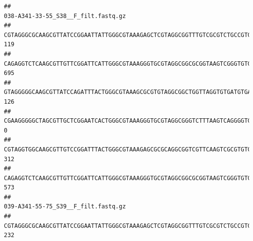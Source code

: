 \documentclass[]{article}
\begin{document}
\begin{verbatim}
##                                                                                                                                                                                                                                                           038-A341-33-55_S38__F_filt.fastq.gz
## CGTAGGGCGCAAGCGTTATCCGGAATTATTGGGCGTAAAGAGCTCGTAGGCGGTTTGTCGCGTCTGCCGTGAAAGTCCGGGGCTCAACTCCGGATCTGCGGTGGGTACGGGCAGACTAGAGTGATGTAGGGGAGACTGGAATTCCTGGTGTAGCGGTGAAATGCGCAGATATCAGGAGGAACACCGATGGCGAAGGCAGGTCTCTGGGCATTAACTGACGCTGAGGAGCGAAAGCATGGGGAGCGAACA                                 119
## CAGAGGTCTCAAGCGTTGTTCGGATTCATTGGGCGTAAAGGGTGCGTAGGCGGCGCGGTAAGTCGGGTGTGAAATCTCGGAGCTTAACTCCGAAACTGCATTCGATACTGCCGTGCTTGAGGACTGGAGAGGAGACTGGAATTTACGGTGTAGCGGTGAAATGCGTAGATATCGTAAGGAAGACCAGTGGCGAAGGCGGGTCTCTGGACAGTTCCTGACGCTGAGGCACGAAGGCCAGGGGAGCAAACG                                 695
## GTAGGGGGCAAGCGTTATCCAGATTTACTGGGCGTAAAGCGCGTGTAGGCGGCTGGTTAGGTGTGATGTGAAATCTTCCGGCTCAACCGGAAAACTGCATTGCAAACCGGCCTGGCTAGAGTGCAGGAGAGGGAAGCGGAATTCCAGGTGTAGCGGTGAAATGCGTAGATATCTGGAGGAACACCAGTGGCGAAGGCGGCTTCCTGGCCTGCAACTGACGCTGAGACGCGAAAGCGTGGGGAGCGAAC                                  126
## CGAAGGGGGCTAGCGTTGCTCGGAATCACTGGGCGTAAAGGGTGCGTAGGCGGGTCTTTAAGTCAGGGGTGAAATCCTGGAGCTCAACTCCAGAACTGCCTTTGATACTGAAGATCTTGAGTTCGGGAGAGGTGAGTGGAACTGCGAGTGTAGAGGTGAAATTCGTAGATATTCGCAAGAACACCAGTGGCGAAGGCGGCTCACTGGCCCGATACTGACGCTGAGGCACGAAAGCGTGGGGAGCAAACA                                   0
## CGTAGGTGGCAAGCGTTGTCCGGATTTACTGGGCGTAAAGAGCGCGCAGGCGGTCGTTCAAGTCGCGTGTGAAAGCCCCCGGCTCAACTGGGGAGGGTCACGCGATACTGATCGACTCGAAGGCAGGAGAGGGTAGTGGAATTCCCGGTGTAGTGGTGAAATGCGTAGATATCGGGAGGAACACCAGTGGCGAAGGCGACTACCTGGCCTGTTCTTGACGCTGAGGCGCGAAAGCTAGGGGAGCAAACG                                 312
## CAGAGGTCTCAAGCGTTGTTCGGATTCATTGGGCGTAAAGGGTGCGTAGGCGGCGCGGTAAGTCGGGTGTGAAATCTCGGGGCTTAACTCCGAAACTGCATTCGATACTGCCGTGCTTGAGGACTGGAGAGGAGACTGGAATTTACGGTGTAGCGGTGAAATGCGTAGATATCGTAAGGAAGACCAGTGGCGAAGGCGGGTCTCTGGACAGTTCCTGACGCTGAGGCACGAAGGCCAGGGGAGCAAACG                                 573
##                                                                                                                                                                                                                                                           039-A341-55-75_S39__F_filt.fastq.gz
## CGTAGGGCGCAAGCGTTATCCGGAATTATTGGGCGTAAAGAGCTCGTAGGCGGTTTGTCGCGTCTGCCGTGAAAGTCCGGGGCTCAACTCCGGATCTGCGGTGGGTACGGGCAGACTAGAGTGATGTAGGGGAGACTGGAATTCCTGGTGTAGCGGTGAAATGCGCAGATATCAGGAGGAACACCGATGGCGAAGGCAGGTCTCTGGGCATTAACTGACGCTGAGGAGCGAAAGCATGGGGAGCGAACA                                 232

\end{verbatim}
\end{document}
